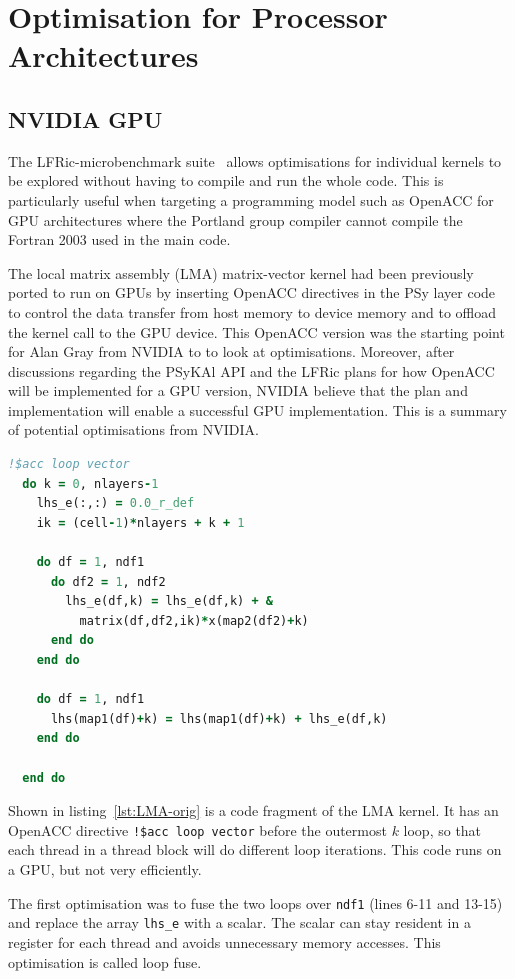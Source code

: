 \section{Optimisation for Processor Architectures
\label{sec:pa}}

\subsection{NVIDIA GPU}
The LFRic-microbenchmark suite~\cite{lfric-microbenchmarks} allows
optimisations for individual kernels to be explored without having to
compile and run the whole code. This is particularly useful when
targeting a programming model such as OpenACC for GPU architectures
where the Portland group compiler cannot compile the Fortran 2003 used 
in the main code.

The local matrix assembly (LMA) matrix-vector kernel had been
previously ported to run on GPUs by inserting OpenACC directives in
the PSy layer code to control the data transfer from host memory to
device memory and to offload the kernel call to the GPU device. This
OpenACC version was the starting point for Alan Gray from NVIDIA to
to look at optimisations. Moreover, after discussions regarding 
the PSyKAl API and the LFRic plans for how OpenACC will be
implemented for a GPU version, NVIDIA believe that the plan and
implementation will enable a successful GPU implementation.
This is a summary of potential optimisations from NVIDIA.

\begin{lstlisting}[language=Fortran,caption={Code fragment of original 
    kernel},label={lst:LMA-orig}]
  !$acc loop vector 
  do k = 0, nlayers-1
    lhs_e(:,:) = 0.0_r_def
    ik = (cell-1)*nlayers + k + 1

    do df = 1, ndf1
      do df2 = 1, ndf2
        lhs_e(df,k) = lhs_e(df,k) + & 
          matrix(df,df2,ik)*x(map2(df2)+k)
      end do
    end do

    do df = 1, ndf1
      lhs(map1(df)+k) = lhs(map1(df)+k) + lhs_e(df,k)
    end do

  end do  
\end{lstlisting}

Shown in listing~\ref{lst:LMA-orig} is a code fragment of the LMA
kernel. It has an OpenACC directive \verb+!$acc loop vector+ before the
outermost $k$ loop, so that each thread in a thread block will do different loop
iterations. This code runs on a GPU, but not very efficiently. 

The first optimisation was to fuse the two loops over \verb+ndf1+
(lines 6-11 and 13-15) and replace the array \verb+lhs_e+ with a
scalar. The scalar can stay resident in a register for each thread and
avoids unnecessary memory accesses. This optimisation is called loop
fuse. 

